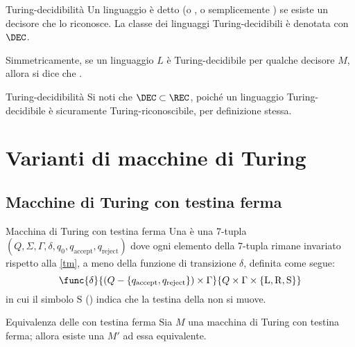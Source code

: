\documentclass[a4paper, 12pt]{report}
\begin{document}
    \begin{frameddefn}{Turing-decidibilità}
        Un linguaggio è detto  (o , o semplicemente ) se esiste un decisore che lo riconosce. La classe dei linguaggi Turing-decidibili è denotata con $\mathrm{\DEC}$.

        Simmetricamente, se un linguaggio $L$ è Turing-decidibile per qualche decisore $M$, allora si dice che .
    \end{frameddefn}

    \begin{framedobs}[label={dec in rec}]{Turing-decidibilità}
        Si noti che $\mathrm{\DEC} \subset \REC$, poiché un linguaggio Turing-decidibile è sicuramente Turing-riconoscibile, per definizione stessa.
    \end{framedobs}

    \section{Varianti di macchine di Turing}

    \subsection{Macchine di Turing con testina ferma}

    \begin{frameddefn}[label={stay tm}]{Macchina di Turing con testina ferma}
        Una  è una 7-tupla $(Q, \Sigma, \Gamma, \delta, q_0, q_\mathrm{accept}, q_\mathrm{reject})$ dove ogni elemento della 7-tupla rimane invariato rispetto alla \cref{tm}, a meno della funzione di transizione $\delta$, definita come segue: $$\func{\delta}{(Q - \{q_\mathrm{accept}, q_\mathrm{reject}\}) \times \Gamma}{Q \times \Gamma \times \{\mathrm L, \mathrm R, \mathrm S\}}$$ in cui il simbolo $\mathrm S$ () indica che la testina della \TM non si muove.
    \end{frameddefn}

    \begin{framedprop}[label={stay tm equiv}]{Equivalenza delle \TM con testina ferma}
        Sia $M$ una macchina di Turing con testina ferma; allora esiste una \TM $M'$ ad essa equivalente.
    \end{framedprop}
\end{document}
